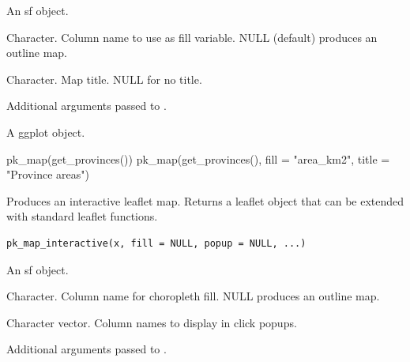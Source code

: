 \documentclass[a4paper]{book}
\begin{document}
%
\begin{Arguments}
\begin{ldescription}
\item[\code{x}] An sf object.

\item[\code{fill}] Character. Column name to use as fill variable. NULL (default)
produces an outline map.

\item[\code{title}] Character. Map title. NULL for no title.

\item[\code{...}] Additional arguments passed to .
\end{ldescription}
\end{Arguments}
%
\begin{Value}
A ggplot object.
\end{Value}
%
\begin{Examples}
\begin{ExampleCode}

  pk_map(get_provinces())
  pk_map(get_provinces(), fill = "area_km2", title = "Province areas")

\end{ExampleCode}
\end{Examples}
%
\begin{Description}
Produces an interactive leaflet map. Returns a leaflet object that
can be extended with standard leaflet functions.
\end{Description}
%
\begin{Usage}
\begin{verbatim}
pk_map_interactive(x, fill = NULL, popup = NULL, ...)
\end{verbatim}
\end{Usage}
%
\begin{Arguments}
\begin{ldescription}
\item[\code{x}] An sf object.

\item[\code{fill}] Character. Column name for choropleth fill. NULL produces
an outline map.

\item[\code{popup}] Character vector. Column names to display in click popups.

\item[\code{...}] Additional arguments passed to .
\end{ldescription}
\end{Arguments}
\end{document}
